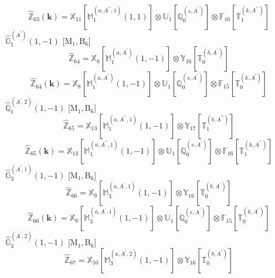 \documentclass[fleqn,10pt,landscape]{article}
\begin{document}
\begin{itemize}
\begin{dmath*}
\hat{\mathbb{Z}}_{63}(\bm{k})=\mathbb{X}_{11}[\mathbb{M}_{1}^{(a,A^{\prime\prime},1)}(1,1)] \otimes\mathbb{U}_{1}[\mathbb{Q}_{0}^{(s,A^{\prime})}] \otimes\mathbb{F}_{16}[\mathbb{T}_{1}^{(k,A^{\prime\prime})}]
\end{dmath*}
\vspace{4mm}
\noindent {} $\,\,\,\hat{\mathbb{G}}_{1}^{(A^{\prime})}(1,-1)$ [M$_{1}$,\,B$_{6}$]
\begin{dmath*}
\hat{\mathbb{Z}}_{64}=\mathbb{X}_{8}[\mathbb{M}_{1}^{(a,A^{\prime})}(1,-1)] \otimes\mathbb{Y}_{16}[\mathbb{T}_{0}^{(b,A^{\prime})}]
\end{dmath*}
\begin{dmath*}
\hat{\mathbb{Z}}_{64}(\bm{k})=\mathbb{X}_{8}[\mathbb{M}_{1}^{(a,A^{\prime})}(1,-1)] \otimes\mathbb{U}_{1}[\mathbb{Q}_{0}^{(s,A^{\prime})}] \otimes\mathbb{F}_{15}[\mathbb{T}_{0}^{(k,A^{\prime})}]
\end{dmath*}
\vspace{4mm}
\noindent {} $\,\,\,\hat{\mathbb{Q}}_{1}^{(A^{\prime},2)}(1,-1)$ [M$_{1}$,\,B$_{6}$]
\begin{dmath*}
\hat{\mathbb{Z}}_{65}=\mathbb{X}_{13}[\mathbb{M}_{1}^{(a,A^{\prime\prime},1)}(1,-1)] \otimes\mathbb{Y}_{17}[\mathbb{T}_{1}^{(b,A^{\prime\prime})}]
\end{dmath*}
\begin{dmath*}
\hat{\mathbb{Z}}_{65}(\bm{k})=\mathbb{X}_{13}[\mathbb{M}_{1}^{(a,A^{\prime\prime},1)}(1,-1)] \otimes\mathbb{U}_{1}[\mathbb{Q}_{0}^{(s,A^{\prime})}] \otimes\mathbb{F}_{16}[\mathbb{T}_{1}^{(k,A^{\prime\prime})}]
\end{dmath*}
\vspace{4mm}
\noindent {} $\,\,\,\hat{\mathbb{G}}_{3}^{(A^{\prime},1)}(1,-1)$ [M$_{1}$,\,B$_{6}$]
\begin{dmath*}
\hat{\mathbb{Z}}_{66}=\mathbb{X}_{9}[\mathbb{M}_{3}^{(a,A^{\prime},1)}(1,-1)] \otimes\mathbb{Y}_{16}[\mathbb{T}_{0}^{(b,A^{\prime})}]
\end{dmath*}
\begin{dmath*}
\hat{\mathbb{Z}}_{66}(\bm{k})=\mathbb{X}_{9}[\mathbb{M}_{3}^{(a,A^{\prime},1)}(1,-1)] \otimes\mathbb{U}_{1}[\mathbb{Q}_{0}^{(s,A^{\prime})}] \otimes\mathbb{F}_{15}[\mathbb{T}_{0}^{(k,A^{\prime})}]
\end{dmath*}
\vspace{4mm}
\noindent {} $\,\,\,\hat{\mathbb{G}}_{3}^{(A^{\prime},2)}(1,-1)$ [M$_{1}$,\,B$_{6}$]
\begin{dmath*}
\hat{\mathbb{Z}}_{67}=\mathbb{X}_{10}[\mathbb{M}_{3}^{(a,A^{\prime},2)}(1,-1)] \otimes\mathbb{Y}_{16}[\mathbb{T}_{0}^{(b,A^{\prime})}]

\end{dmath*}
\end{itemize}
\end{document}
